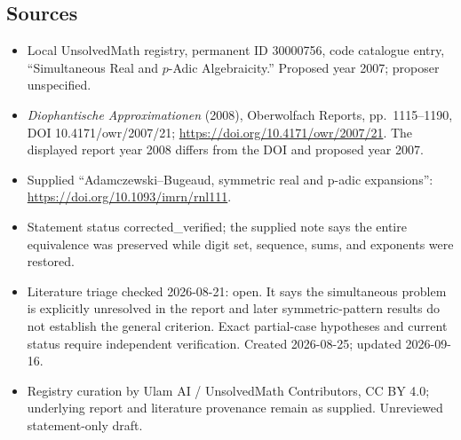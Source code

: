 \documentclass[11pt]{article}
\begin{document}
\subsection{Sources}
\begin{itemize}
\item Local UnsolvedMath registry, permanent ID 30000756, code catalogue entry, ``Simultaneous Real and $p$-Adic Algebraicity.'' Proposed year 2007; proposer unspecified.
\item \emph{Diophantische Approximationen} (2008), Oberwolfach Reports, pp.\ 1115--1190, DOI 10.4171/owr/2007/21; \url{https://doi.org/10.4171/owr/2007/21}. The displayed report year 2008 differs from the DOI and proposed year 2007.
\item Supplied ``Adamczewski--Bugeaud, symmetric real and p-adic expansions'': \url{https://doi.org/10.1093/imrn/rnl111}.
\item Statement status corrected\_verified; the supplied note says the entire equivalence was preserved while digit set, sequence, sums, and exponents were restored.
\item Literature triage checked 2026-08-21: open. It says the simultaneous problem is explicitly unresolved in the report and later symmetric-pattern results do not establish the general criterion. Exact partial-case hypotheses and current status require independent verification. Created 2026-08-25; updated 2026-09-16.
\item Registry curation by Ulam AI / UnsolvedMath Contributors, CC BY 4.0; underlying report and literature provenance remain as supplied. Unreviewed statement-only draft.
\end{itemize}
\end{document}
